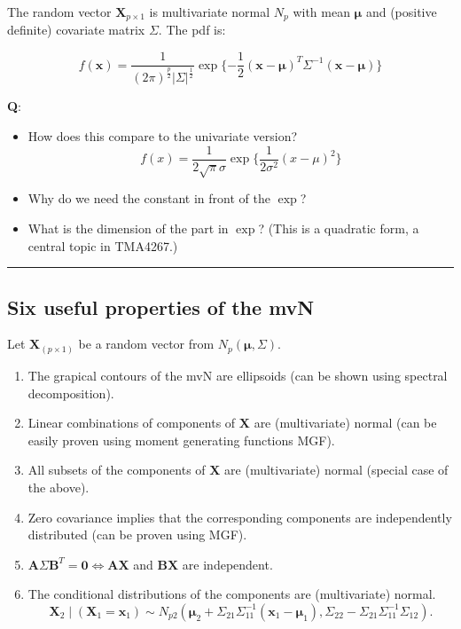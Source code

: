 \documentclass[]{article}
\providecommand{\tightlist}{%
  \setlength{\itemsep}{0pt}\setlength{\parskip}{0pt}}
\begin{document}
The random vector \(\mathbf{X}_{p\times 1}\) is multivariate normal
\(N_p\) with mean \(\mathbf{\mu}\) and (positive definite) covariate
matrix \(\Sigma\). The pdf is:

\[f(\mathbf{x})=\frac{1}{(2\pi)^\frac{p}{2}|\Sigma|^\frac{1}{2}} \exp\{-\frac{1}{2}(\mathbf{x}-\mathbf{\mu})^T\Sigma^{-1}(\mathbf{x}-\mathbf{\mu})\}\]

\textbf{Q}:

\begin{itemize}
\tightlist
\item
  How does this compare to the univariate version?
  \[f(x)=\frac{1}{2\sqrt{\pi}\sigma}\exp\{ \frac{1}{2\sigma^2}(x-\mu)^2\}\]
\item
  Why do we need the constant in front of the \(\exp\)?
\item
  What is the dimension of the part in \(\exp\)? (This is a quadratic
  form, a central topic in TMA4267.)
\end{itemize}

\begin{center}\rule{0.5\linewidth}{\linethickness}\end{center}

\hypertarget{six-useful-properties-of-the-mvn}{%
\subsection{Six useful properties of the
mvN}\label{six-useful-properties-of-the-mvn}}

Let \(\mathbf{X}_{(p\times 1)}\) be a random vector from
\(N_p(\mathbf{\mu},\Sigma)\).

\begin{enumerate}
\def\labelenumi{\arabic{enumi}.}
\tightlist
\item
  The grapical contours of the mvN are ellipsoids (can be shown using
  spectral decomposition).
\item
  Linear combinations of components of \(\mathbf{X}\) are (multivariate)
  normal (can be easily proven using moment generating functions MGF).
\item
  All subsets of the components of \(\mathbf{X}\) are (multivariate)
  normal (special case of the above).
\item
  Zero covariance implies that the corresponding components are
  independently distributed (can be proven using MGF).
\item
  \(\mathbf{A}\Sigma\mathbf{B}^T=\mathbf{0} \Leftrightarrow \mathbf{A}\mathbf{X}\)
  and \(\mathbf{B}\mathbf{X}\) are independent.
\item
  The conditional distributions of the components are (multivariate)
  normal.
  \[\mathbf{X}_2 \mid (\mathbf{X}_1=\mathbf{x}_1) \sim N_{p2}(\mathbf{\mu}_2+               \Sigma_{21}\Sigma_{11}^{-1} (\mathbf{x}_1-\mathbf{\mu}_1),\Sigma_{22}-\Sigma_{21}\Sigma_{11}^{-1}\Sigma_{12}).\]
\end{enumerate}
\end{document}
